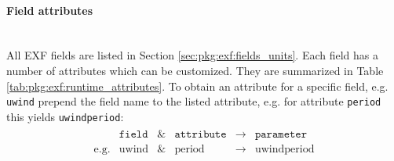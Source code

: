 \paragraph{Field attributes} ~ \\
%
All EXF fields are listed in Section \ref{sec:pkg:exf:fields_units}.
Each field has a number of attributes which can be customized.
They are summarized in
Table \ref{tab:pkg:exf:runtime_attributes}.
To obtain an attribute for a specific field, e.g. \texttt{uwind}
prepend the field name to the listed attribute, e.g. for attribute
\texttt{period} this yields \texttt{uwindperiod}:
%
\begin{eqnarray*}
  \begin{array}{cccccc}
    ~ & \texttt{field} & \& & \texttt{attribute} & \longrightarrow & \texttt{parameter} \\
    \text{e.g.} & \text{uwind} & \& & \text{period} & \longrightarrow & \text{uwindperiod} \\
  \end{array}
\end{eqnarray*}
%

